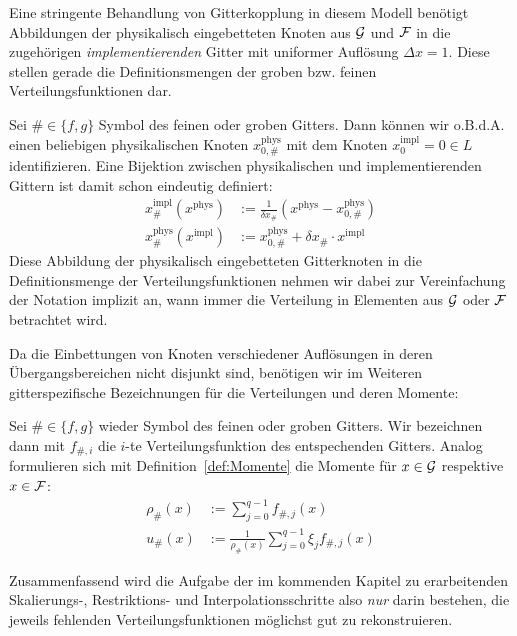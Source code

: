 Eine stringente Behandlung von Gitterkopplung in diesem Modell benötigt Abbildungen der physikalisch eingebetteten Knoten aus \(\mathcal{G}\) und \(\mathcal{F}\) in die zugehörigen \emph{implementierenden} Gitter mit uniformer Auflösung \(\Delta x = 1\). Diese stellen gerade die Definitionsmengen der groben bzw. feinen Verteilungsfunktionen dar.

\begin{Definition}
\label{def:BijImplGitter}
Sei \(\# \in \{f, g\}\) Symbol des feinen oder groben Gitters.
Dann können wir o.B.d.A. einen beliebigen physikalischen Knoten \(x_{0,\#}^\text{phys}\) mit dem Knoten \(x_0^\text{impl} = 0 \in L\) identifizieren. Eine Bijektion zwischen physikalischen und implementierenden Gittern ist damit schon eindeutig definiert:
\begin{align*}
x_\#^\text{impl}(x^\text{phys}) &:= \frac{1}{\delta x_\#} (x^\text{phys} - x_{0,\#}^\text{phys}) \\
x_\#^\text{phys}(x^\text{impl}) &:= x_{0,\#}^\text{phys} + \delta x_\# \cdot x^\text{impl}
\end{align*}
Diese Abbildung der physikalisch eingebetteten Gitterknoten in die Definitionsmenge der Verteilungsfunktionen nehmen wir dabei zur Vereinfachung der Notation implizit an, wann immer die Verteilung in Elementen aus \(\mathcal{G}\) oder \(\mathcal{F}\) betrachtet wird.
\end{Definition}

Da die Einbettungen von Knoten verschiedener Auflösungen in deren Übergangsbereichen nicht disjunkt sind, benötigen wir im Weiteren gitterspezifische Bezeichnungen für die Verteilungen und deren Momente:

\begin{Definition}
Sei \(\# \in \{f, g\}\) wieder Symbol des feinen oder groben Gitters. Wir bezeichnen dann mit \(f_{\#,i}\) die \(i\)-te Verteilungsfunktion des entspechenden Gitters. Analog formulieren sich mit Definition~\ref{def:Momente} die Momente für \(x \in \mathcal{G}\) respektive \(x \in \mathcal{F}\):
\begin{align*}
\rho_\#(x) &:= \sum_{j=0}^{q-1} f_{\#,j}(x) \\
u_\#(x) &:= \frac{1}{\rho_\#(x)} \sum_{j=0}^{q-1} \xi_j f_{\#,j}(x)
\end{align*}
\end{Definition}

\bigskip
Zusammenfassend wird die Aufgabe der im kommenden Kapitel zu erarbeitenden Skalierungs-, Restriktions- und Interpolationsschritte also \emph{nur} darin bestehen, die jeweils fehlenden Verteilungsfunktionen möglichst gut zu rekonstruieren.

